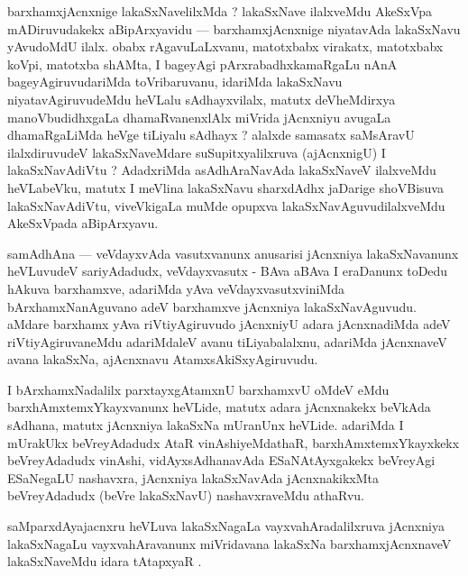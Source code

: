 \begin{artha}
barxhamxjAcnxnige lakaSxNavelilxMda ? lakaSxNave ilalxveMdu AkeSxVpa mADiruvudakekx aBipArxyavidu --- barxhamxjAcnxnige niyatavAda lakaSxNavu yAvudoMdU ilalx. obabx rAgavuLaLxvanu, matotxbabx virakatx, matotxbabx koVpi, matotxba shAMta, I bageyAgi pArxrabadhxkamaRgaLu nAnA bageyAgiruvudariMda toVribaruvanu, idariMda lakaSxNavu niyatavAgiruvudeMdu heVLalu sAdhayxvilalx, matutx deVheMdirxya manoVbudidhxgaLa dhamaRvanenxlAlx miVrida jAcnxniyu avugaLa dhamaRgaLiMda heVge tiLiyalu sAdhayx ? alalxde samasatx saMsAravU ilalxdiruvudeV lakaSxNaveMdare suSupitxyalilxruva (ajAcnxnigU) I lakaSxNavAdiVtu ? AdadxriMda asAdhAraNavAda lakaSxNaveV ilalxveMdu heVLabeVku, matutx I meVlina lakaSxNavu sharxdAdhx jaDarige shoVBisuva lakaSxNavAdiVtu, viveVkigaLa muMde opupxva lakaSxNavAguvudilalxveMdu AkeSxVpada aBipArxyavu.
\end{artha}

\begin{artha}
samAdhAna --- veVdayxvAda vasutxvanunx anusarisi jAcnxniya lakaSxNavanunx heVLuvudeV sariyAdadudx, veVdayxvasutx - BAva aBAva I eraDanunx toDedu hAkuva barxhamxve, adariMda yAva veVdayxvasutxviniMda bArxhamxNanAguvano adeV barxhamxve jAcnxniya lakaSxNavAguvudu. aMdare barxhamx yAva riVtiyAgiruvudo jAcnxniyU adara jAcnxnadiMda adeV riVtiyAgiruvaneMdu adariMdaleV avanu tiLiyabalalxnu, adariMda jAcnxnaveV avana lakaSxNa, ajAcnxnavu AtamxsAkiSxyAgiruvudu.
\end{artha}


\begin{artha}
I bArxhamxNadalilx parxtayxgAtamxnU barxhamxvU oMdeV eMdu barxhAmxtemxYkayxvanunx heVLide, matutx adara jAcnxnakekx beVkAda sAdhana, matutx jAcnxniya lakaSxNa mUranUnx heVLide. adariMda I mUrakUkx beVreyAdadudx AtaR vinAshiyeMdathaR, barxhAmxtemxYkayxkekx beVreyAdadudx vinAshi, vidAyxsAdhanavAda ESaNAtAyxgakekx beVreyAgi ESaNegaLU nashavxra, jAcnxniya lakaSxNavAda jAcnxnakikxMta beVreyAdadudx (beVre lakaSxNavU) nashavxraveMdu athaRvu.
\end{artha}

\begin{artha}
saMparxdAyajacnxru heVLuva lakaSxNagaLa vayxvahAradalilxruva jAcnxniya lakaSxNagaLu vayxvahAravanunx miVridavana lakaSxNa barxhamxjAcnxnaveV lakaSxNaveMdu idara tAtapxyaR .
\end{artha}


